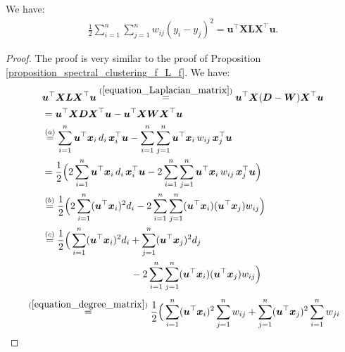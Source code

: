 \documentclass[lang=cn,10pt]{gorgeousnbook}
\numberwithin{equation}{section}%
\numberwithin{figure}{section}%
\begin{document}
\begin{proposition}\label{proposition_LPP_y_L_y}
We have:
\begin{align}
\frac{1}{2} \sum_{i=1}^n \sum_{j=1}^n w_{ij} (y_i - y_j)^2 = \boldsymbol{u}^\top \boldsymbol{X} \boldsymbol{L} \boldsymbol{X}^\top \boldsymbol{u}.
\end{align}
\end{proposition}
\begin{proof}
The proof is very similar to the proof of Proposition \ref{proposition_spectral_clustering_f_L_f}. We have:
\begin{align*}
&\boldsymbol{u}^\top \boldsymbol{X} \boldsymbol{L} \boldsymbol{X}^\top \boldsymbol{u} \overset{(\ref{equation_Laplacian_matrix})}{=} \boldsymbol{u}^\top \boldsymbol{X} (\boldsymbol{D} - \boldsymbol{W}) \boldsymbol{X}^\top \boldsymbol{u} \\
&= \boldsymbol{u}^\top \boldsymbol{X} \boldsymbol{D} \boldsymbol{X}^\top \boldsymbol{u} - \boldsymbol{u}^\top \boldsymbol{X} \boldsymbol{W} \boldsymbol{X}^\top \boldsymbol{u} \\
&\overset{(a)}{=} \sum_{i=1}^n \boldsymbol{u}^\top \boldsymbol{x}_i\, d_i\, \boldsymbol{x}_i^\top \boldsymbol{u} - \sum_{i=1}^n \sum_{j=1}^n \boldsymbol{u}^\top \boldsymbol{x}_i\, w_{ij}\, \boldsymbol{x}_j^\top \boldsymbol{u} \\
&= \frac{1}{2} \Big(2\sum_{i=1}^n \boldsymbol{u}^\top \boldsymbol{x}_i\, d_i\, \boldsymbol{x}_i^\top \boldsymbol{u} - 2\sum_{i=1}^n \sum_{j=1}^n \boldsymbol{u}^\top \boldsymbol{x}_i\, w_{ij}\, \boldsymbol{x}_j^\top \boldsymbol{u}\Big) \\
&\overset{(b)}{=} \frac{1}{2} \Big(2\sum_{i=1}^n (\boldsymbol{u}^\top \boldsymbol{x}_i)^2 d_i - 2\sum_{i=1}^n \sum_{j=1}^n (\boldsymbol{u}^\top \boldsymbol{x}_i) (\boldsymbol{u}^\top \boldsymbol{x}_j) w_{ij}\Big) \\
&\overset{(c)}{=} \frac{1}{2} \Big(\sum_{i=1}^n (\boldsymbol{u}^\top \boldsymbol{x}_i)^2 d_i + \sum_{j=1}^n (\boldsymbol{u}^\top \boldsymbol{x}_j)^2 d_j \\
&~~~~~~~~~~~~~~~~~~~~~~~~~~~ - 2\sum_{i=1}^n \sum_{j=1}^n (\boldsymbol{u}^\top \boldsymbol{x}_i) (\boldsymbol{u}^\top \boldsymbol{x}_j) w_{ij}\Big) 
\end{align*}
\begin{align*}
&\overset{(\ref{equation_degree_matrix})}{=} \frac{1}{2} \Big(\sum_{i=1}^n (\boldsymbol{u}^\top \boldsymbol{x}_i)^2 \sum_{j=1}^n w_{ij} + \sum_{j=1}^n (\boldsymbol{u}^\top \boldsymbol{x}_j)^2 \sum_{i=1}^n w_{ji} \\

\end{align*}
\end{proof}
\end{document}
